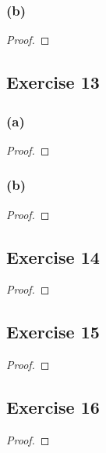 \documentclass[14pt]{extarticle}
\begin{document}
\subsubsection{(b)}

\begin{proof}

\end{proof}

\subsection{Exercise 13}

\subsubsection{(a)}

\begin{proof}

\end{proof}

\subsubsection{(b)}

\begin{proof}

\end{proof}

\subsection{Exercise 14}

\begin{proof}

\end{proof}

\subsection{Exercise 15}

\begin{proof}

\end{proof}

\subsection{Exercise 16}

\begin{proof}

\end{proof}
\end{document}
